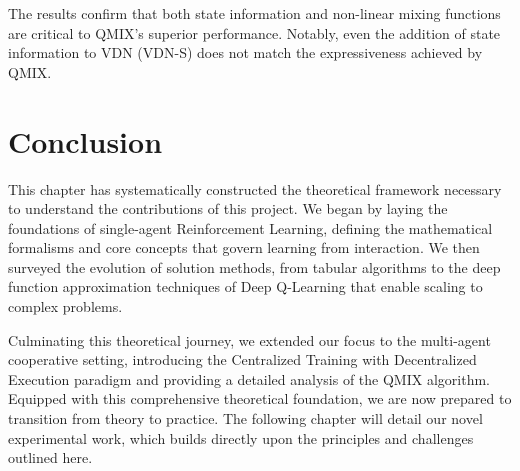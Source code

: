 \documentclass[../Main.tex]{subfiles}
\begin{document}
The results confirm that both state information and non-linear mixing functions are critical to QMIX’s superior performance. Notably, even the addition of state information to VDN (VDN-S) does not match the expressiveness achieved by QMIX.

\section*{Conclusion}

This chapter has systematically constructed the theoretical framework necessary to understand the contributions of this project. We began by laying the foundations of single-agent Reinforcement Learning, defining the mathematical formalisms and core concepts that govern learning from interaction. We then surveyed the evolution of solution methods, from tabular algorithms to the deep function approximation techniques of Deep Q-Learning that enable scaling to complex problems.

Culminating this theoretical journey, we extended our focus to the multi-agent cooperative setting, introducing the Centralized Training with Decentralized Execution paradigm and providing a detailed analysis of the QMIX algorithm. Equipped with this comprehensive theoretical foundation, we are now prepared to transition from theory to practice. The following chapter will detail our novel experimental work, which builds directly upon the principles and challenges outlined here.

\clearpage
\biblio %
\end{document}
